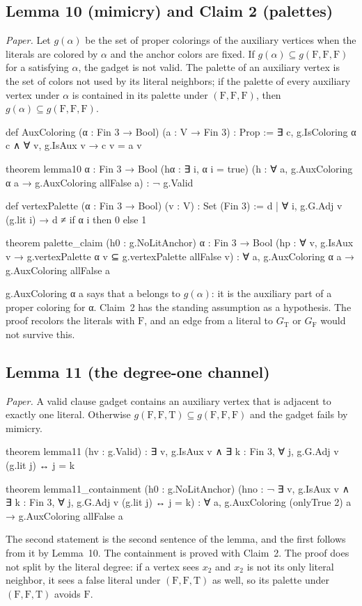 \documentclass[11pt,a4paper]{article}
\newcommand{\leanus}{\textunderscore\allowbreak}
\newcommand{\lean}[1]{{\ttfamily\let\_\leanus #1}}
\newcommand{\GT}{G_{\mathrm{T}}}
\newcommand{\GF}{G_{\mathrm{F}}}
\newcommand{\T}{\mathrm{T}}
\newcommand{\F}{\mathrm{F}}
\begin{document}
\subsection{Lemma 10 (mimicry) and Claim 2 (palettes)}
\emph{Paper.} Let $g(\alpha)$ be the set of proper colorings of the
auxiliary vertices when the literals are colored by $\alpha$ and the anchor
colors are fixed. If $g(\alpha)\subseteq g(\F,\F,\F)$ for a satisfying
$\alpha$, the gadget is not valid. The palette of an auxiliary vertex is the
set of colors not used by its literal neighbors; if the palette of every
auxiliary vertex under $\alpha$ is contained in its palette under
$(\F,\F,\F)$, then $g(\alpha)\subseteq g(\F,\F,\F)$.
\begin{code}
def AuxColoring (α : Fin 3 → Bool) (a : V → Fin 3) : Prop :=
  ∃ c, g.IsColoring α c ∧ ∀ v, g.IsAux v → c v = a v

theorem lemma10 {α : Fin 3 → Bool} (hα : ∃ i, α i = true)
    (h : ∀ a, g.AuxColoring α a → g.AuxColoring allFalse a) : ¬ g.Valid

def vertexPalette (α : Fin 3 → Bool) (v : V) : Set (Fin 3) :=
  {d | ∀ i, g.G.Adj v (g.lit i) → d ≠ if α i then 0 else 1}

theorem palette_claim (h0 : g.NoLitAnchor) {α : Fin 3 → Bool}
    (hp : ∀ v, g.IsAux v → g.vertexPalette α v ⊆ g.vertexPalette allFalse v) :
    ∀ a, g.AuxColoring α a → g.AuxColoring allFalse a
\end{code}
\lean{g.AuxColoring α a} says that \lean{a} belongs to $g(\alpha)$: it is
the auxiliary part of a proper coloring for \lean{α}. Claim~2 has the
standing assumption as a hypothesis. The proof recolors the literals with
$\F$, and an edge from a literal to $\GT$ or $\GF$ would not survive this.

\subsection{Lemma 11 (the degree-one channel)}
\emph{Paper.} A valid clause gadget contains an auxiliary vertex that is
adjacent to exactly one literal. Otherwise
$g(\F,\F,\T)\subseteq g(\F,\F,\F)$ and the gadget fails by mimicry.
\begin{code}
theorem lemma11 (hv : g.Valid) :
    ∃ v, g.IsAux v ∧ ∃ k : Fin 3, ∀ j, g.G.Adj v (g.lit j) ↔ j = k

theorem lemma11_containment (h0 : g.NoLitAnchor)
    (hno : ¬ ∃ v, g.IsAux v ∧ ∃ k : Fin 3, ∀ j, g.G.Adj v (g.lit j) ↔ j = k) :
    ∀ a, g.AuxColoring (onlyTrue 2) a → g.AuxColoring allFalse a
\end{code}
The second statement is the second sentence of the lemma, and the first
follows from it by Lemma~10. The containment is proved with Claim~2. The
proof does not split by the literal degree: if a vertex sees $x_2$ and $x_2$
is not its only literal neighbor, it sees a false literal under
$(\F,\F,\T)$ as well, so its palette under $(\F,\F,\T)$ avoids $\F$.
\end{document}
